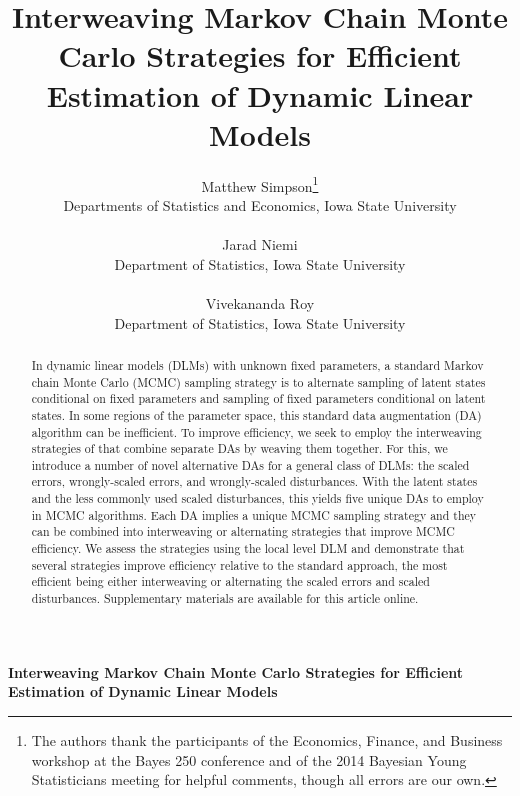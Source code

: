 \documentclass[12pt]{article}
\begin{document}
\def\spacingset#1{\renewcommand{\baselinestretch}%
{#1}\small\normalsize} \spacingset{1}

\blind
{
  \title{\bf Interweaving Markov Chain Monte Carlo Strategies for Efficient
    Estimation of Dynamic Linear Models}
  \author{Matthew Simpson\thanks{
    The authors thank the participants of the Economics, Finance, and Business workshop at the Bayes 250 conference and of the 2014 Bayesian Young Statisticians meeting for helpful comments, though all errors are our own.}\hspace{.2cm}\\
    Departments of Statistics and Economics, Iowa State University\\~\\
    Jarad Niemi \\
    Department of Statistics, Iowa State University\\~\\
    Vivekananda Roy\\
    Department of Statistics, Iowa State University}
  \maketitle
} \fi

\blind
{
  \bigskip
  \bigskip
  \bigskip
  \begin{center}
    {\LARGE\bf Interweaving Markov Chain Monte Carlo Strategies for Efficient
    Estimation of Dynamic Linear Models}
\end{center}
  \medskip
} \fi

\bigskip


\begin{abstract}
In dynamic linear models (DLMs) with unknown fixed parameters, a standard Markov chain Monte Carlo (MCMC) sampling strategy is to alternate sampling of latent states conditional on fixed parameters and sampling of fixed parameters conditional on latent states. In some regions of the parameter space, this standard data augmentation (DA) algorithm can be inefficient. To improve efficiency, we seek to employ the interweaving strategies of \citet{yu2011center} that combine separate DAs by weaving them together. For this, we introduce a number of novel alternative DAs for a general class of DLMs: the scaled errors, wrongly-scaled errors, and wrongly-scaled disturbances. With the latent states and the less commonly used scaled disturbances, this yields five unique DAs to employ in MCMC algorithms. Each DA implies a unique MCMC sampling strategy and they can be combined into interweaving or alternating strategies that improve MCMC efficiency. We assess the strategies using the local level DLM and demonstrate that several strategies improve efficiency relative to the standard approach, the most efficient being either interweaving or alternating the scaled errors and scaled disturbances. Supplementary materials are available for this article online.
\end{abstract}
\end{document}
